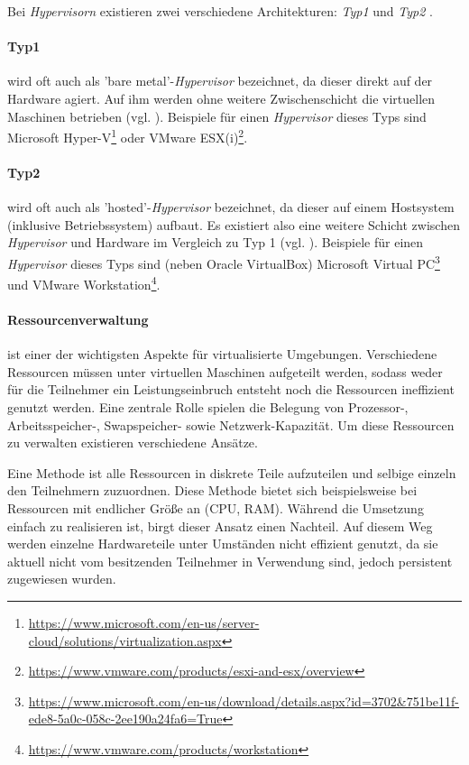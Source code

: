 Bei \textit{Hypervisorn} existieren zwei verschiedene Architekturen: \textit{Typ1} und
\textit{Typ2} \cite{dash13}.

\paragraph{Typ1} wird oft auch als 'bare metal'-\textit{Hypervisor} bezeichnet, da dieser direkt
auf der Hardware agiert. Auf ihm werden ohne weitere Zwischenschicht die virtuellen Maschinen
betrieben (vgl. ).
Beispiele für einen \textit{Hypervisor} dieses Typs sind Microsoft Hyper-V\footnote{\url{https://www.microsoft.com/en-us/server-cloud/solutions/virtualization.aspx}}
oder VMware ESX(i)\footnote{\url{https://www.vmware.com/products/esxi-and-esx/overview}}.

\paragraph{Typ2} wird oft auch als 'hosted'-\textit{Hypervisor} bezeichnet, da dieser auf
einem Hostsystem (inklusive Betriebssystem) aufbaut. Es existiert also eine weitere Schicht
zwischen \textit{Hypervisor} und Hardware im Vergleich zu Typ 1 (vgl. ).
Beispiele für einen \textit{Hypervisor} dieses Typs sind (neben Oracle VirtualBox) Microsoft
Virtual PC\footnote{\url{https://www.microsoft.com/en-us/download/details.aspx?id=3702&751be11f-ede8-5a0c-058c-2ee190a24fa6=True}} und
VMware Workstation\footnote{\url{https://www.vmware.com/products/workstation}}.

\paragraph{Ressourcenverwaltung} ist einer der wichtigsten Aspekte für virtualisierte Umgebungen.
Verschiedene Ressourcen müssen unter virtuellen Maschinen aufgeteilt werden, sodass weder für die
Teilnehmer ein Leistungseinbruch entsteht noch die Ressourcen ineffizient genutzt werden.
Eine zentrale Rolle spielen die Belegung von Prozessor-, Arbeitsspeicher-,
Swapspeicher- sowie Netzwerk-Kapazität. Um diese Ressourcen zu verwalten existieren verschiedene
Ansätze.

Eine Methode ist alle Ressourcen in diskrete Teile aufzuteilen und selbige einzeln den Teilnehmern
zuzuordnen. Diese Methode bietet sich beispielsweise bei Ressourcen mit endlicher Größe an
(CPU, RAM). Während die Umsetzung einfach zu realisieren ist, birgt dieser Ansatz einen Nachteil.
Auf diesem Weg werden einzelne Hardwareteile unter Umständen nicht effizient genutzt,
da sie aktuell nicht vom besitzenden Teilnehmer in Verwendung sind, jedoch persistent zugewiesen wurden.

